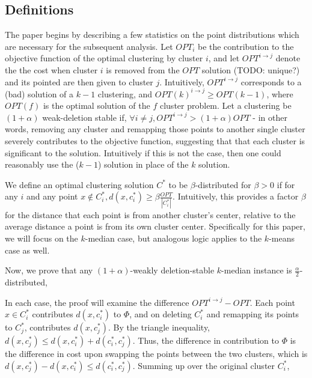 \documentclass[paper=a4, fontsize=11pt]{scrartcl} %
\numberwithin{equation}{section} %
\numberwithin{figure}{section} %
\numberwithin{table}{section} %
\begin{document}
\subsection{Definitions}
The paper begins by describing a few statistics on the point distributions which are necessary for the subsequent analysis.  Let $OPT_i$ be the contribution to the objective function of the optimal clustering by cluster $i$, and let $OPT^{i \rightarrow j}$ denote the the cost when cluster $i$ is removed from the $OPT$ solution (TODO: unique?) and its pointed are then given to cluster $j$.  Intuitively, $OPT^{i \rightarrow j}$ corresponds to a (bad) solution of a $k-1$ clustering, and $OPT(k)^{i \rightarrow j} \geq OPT(k-1)$, where $OPT(f)$ is the optimal solution of the $f$ cluster problem.  Let a clustering be $(1 + \alpha)$ weak-deletion stable if, $\forall i \neq j, OPT^{i \rightarrow j} > (1 + \alpha)OPT$ - in other words, removing any cluster and remapping those points to another single cluster severely contributes to the objective function, suggesting that that each cluster is significant to the solution. Intuitively if this is not the case, then one could reasonably use the ($k-1$) solution in place of the $k$ solution.

  We define an optimal clustering solution $C^*$ to be $\beta$-distributed for $\beta > 0$ if for any $i$ and any point $x \notin C^*_i, d(x, c^*_i) \geq \beta \frac{OPT}{|C^*_i|}$. Intuitively, this provides a factor $\beta$ for the distance that each point is from another cluster's center, relative to the average distance a point is from its own cluster center. Specifically for this paper, we will focus on the $k$-median case, but analogous logic applies to the $k$-means case as well.   

Now, we prove that any $(1+\alpha)$-weakly deletion-stable $k$-median instance is $\frac{\alpha}{2}$-distributed,


In each case, the proof will examine the difference $OPT^{i \rightarrow j} - OPT$.  Each point $x \in C^*_i$ contributes $d(x, c^*_i)$ to $\Phi$, and on deleting $C^*_i$ and remapping its points to $C^*_j$, contributes $d(x, c^*_j)$.  By the triangle inequality, $d(x, c^*_j) \leq d(x, c^*_i) + d(c^*_i, c^*_j)$. Thus, the difference in contribution to $\Phi$ is the difference in cost upon swapping the points between the two clusters, which is $ d(x, c^*_j)  - d(x, c^*_i) \leq d(c^*_i, c^*_j)$.  Summing up over the original cluster $C^*_i$,
\end{document}
